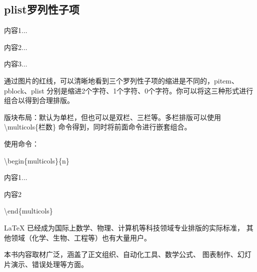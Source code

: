 \documentclass[a4paper,12pt]{ctexart}
\newenvironment{ul}{
	\begin{itemize}[topsep=0pt,labelsep=.5em,leftmargin=4.5em,itemsep=-.5em]
	}{\end{itemize}}
\newcommand{\fpic}[1]{
	\begin{figure}[!h]
		\centering
		\fbox{\texttt{[image: \#1]}}
	\end{figure}
}
\begin{document}
\begin{ul}
\begin{latexcode}
	\subsection{plist罗列性子项}
	
		\end{latexcode}
		\fpic{litems.png}
		通过图片的红线，可以清晰地看到三个罗列性子项的缩进是不同的，pitem、pblock、plist 分别是缩进2个字符、1个字符、0个字符。你可以将这三种形式进行组合以得到合理排版。
	
	\end{ul}
	
	\newpage
	版块布局：默认为单栏，但也可以是双栏、三栏等。多栏排版可以使用 \textbackslash multicols\{栏数\} 命令得到，同时将前面命令进行嵌套组合。
	
	\quad 使用命令：
	
	\qquad\textbackslash begin\{multicols\}\{n\}
	
	\qquad 内容1...
	
	\qquad 内容2
	
	\qquad \textbackslash end\{multicols\}
	\begin{latexcode}
	\begin{multicols}{2}
    LaTeX 已经成为国际上数学、物理、计算机等科技领域专业排版的实际标准，
    其他领域（化学、生物、工程等）也有大量用户。
		
    本书内容取材广泛，涵盖了正文组织、自动化工具、数学公式、
    图表制作、幻灯片演示、错误处理等方面。
	\end{multicols}
	\end{latexcode}
	\fpic{nsides.png}
	
\end{document}

